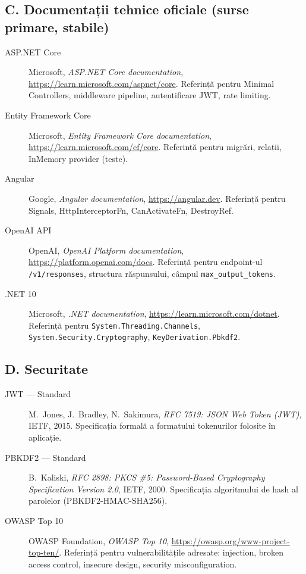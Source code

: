 \subsection*{C. Documentații tehnice oficiale (surse primare, stabile)}

\begin{description}
  \item[ASP.NET Core]
    Microsoft, \emph{ASP.NET Core documentation},
    \url{https://learn.microsoft.com/aspnet/core}.
    Referință pentru Minimal Controllers, middleware pipeline, autentificare
    JWT, rate limiting.

  \item[Entity Framework Core]
    Microsoft, \emph{Entity Framework Core documentation},
    \url{https://learn.microsoft.com/ef/core}.
    Referință pentru migrări, relații, InMemory provider (teste).

  \item[Angular]
    Google, \emph{Angular documentation},
    \url{https://angular.dev}.
    Referință pentru Signals, HttpInterceptorFn, CanActivateFn, DestroyRef.

  \item[OpenAI API]
    OpenAI, \emph{OpenAI Platform documentation},
    \url{https://platform.openai.com/docs}.
    Referință pentru endpoint-ul \texttt{/v1/responses}, structura răspunsului,
    câmpul \texttt{max\_output\_tokens}.

  \item[.NET 10]
    Microsoft, \emph{.NET documentation},
    \url{https://learn.microsoft.com/dotnet}.
    Referință pentru \texttt{System.Threading.Channels},
    \texttt{System.Security.Cryptography},
    \texttt{KeyDerivation.Pbkdf2}.
\end{description}

\subsection*{D. Securitate}

\begin{description}
  \item[JWT — Standard]
    M.\ Jones, J.\ Bradley, N.\ Sakimura,
    \emph{RFC 7519: JSON Web Token (JWT)},
    IETF, 2015.
    Specificația formală a formatului tokenurilor folosite în aplicație.

  \item[PBKDF2 — Standard]
    B.\ Kaliski, \emph{RFC 2898: PKCS \#5: Password-Based Cryptography
    Specification Version 2.0}, IETF, 2000.
    Specificația algoritmului de hash al parolelor (PBKDF2-HMAC-SHA256).

  \item[OWASP Top 10]
    OWASP Foundation, \emph{OWASP Top 10},
    \url{https://owasp.org/www-project-top-ten/}.
    Referință pentru vulnerabilitățile adresate: injection, broken access
    control, insecure design, security misconfiguration.
\end{description}

